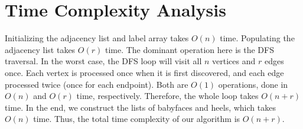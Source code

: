\documentclass{article}
\begin{document}
\section{Time Complexity Analysis}

Initializing the adjacency list and label array takes $O(n)$ time.
Populating the adjacency list takes $O(r)$ time.
The dominant operation here is the DFS traversal.
In the worst case, the DFS loop will visit all $n$ vertices and $r$ edges once.
Each vertex is processed once when it is first discovered, and each edge processed twice (once for each endpoint).
Both are $O(1)$ operations, done in $O(n)$ and $O(r)$ time, respectively.
Therefore, the whole loop takes $O(n + r)$ time.
In the end, we construct the lists of babyfaces and heels, which takes $O(n)$ time.
Thus, the total time complexity of our algorithm is $O(n + r)$.
\end{document}
